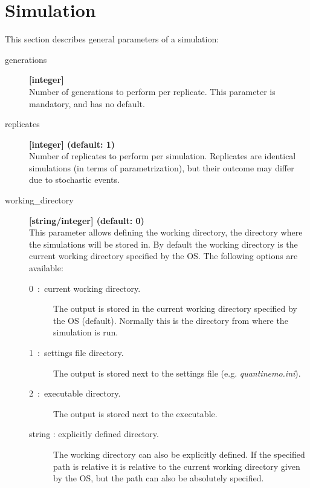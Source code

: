 \documentclass[letterpaper,12pt,oneside]{book}
\begin{document}
\chapter{Simulation}\label{chap:simparam}
This section describes general parameters of a simulation: 
\begin{description}
\item[generations]\textbf{[integer]}\\
Number of generations to perform per replicate. This parameter is mandatory, and has no default.
 
\item[replicates]\textbf{[integer] (default: 1)}\\
Number of replicates to perform per simulation. Replicates are identical simulations (in terms of parametrization), but their outcome may differ due to stochastic events. 

\item[working\_directory]\textbf{[string/integer] (default: 0)}\\
This parameter allows defining the working directory, the directory where the simulations will be stored in. By default the working directory is the current working directory specified by the OS. The following options are available:
\begin{description}
\item[0~:~current working directory.] The output is stored in the current working directory specified by the OS (default). Normally this is the directory from where the simulation is run. 
\item[1~:~settings file directory.] The output is stored next to the settings file (e.g. \textit{quantinemo.ini}).
\item[2~:~executable directory.] The output is stored next to the executable.  
\item[string : explicitly defined directory.] The working directory can also be explicitly defined. If the specified path is relative it is relative to the current working directory given by the OS, but the path can also be absolutely specified.
\end{description}



\end{description}
\end{document}
